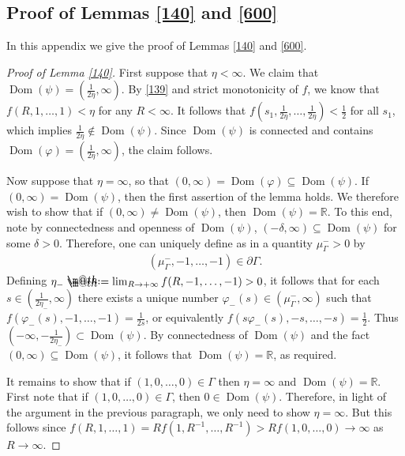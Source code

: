 \documentclass[12pt]{article}
\makeatletter
\numberwithin{equation}{section}
\theoremstyle{plain}
\theoremstyle{definition}
\renewcommand{\phi}{\varphi}
\newcommand*{\defeq}{\mathrel{\rlap{%
			\raisebox{0.3ex}{$\m@th\cdot$}}%
		\raisebox{-0.3ex}{$\m@th\cdot$}}%
	=}
\makeatother
\begin{document}
\begin{appendices}
	

	
\section{Proof of Lemmas \ref{140} and \ref{600}}\label{appa}

In this appendix we give the proof of Lemmas \ref{140} and \ref{600}. 

\begin{proof}[Proof of Lemma \ref{140}]
	First suppose that $\eta<\infty$. We claim that $\operatorname{Dom}(\psi) = (\frac{1}{2\eta},\infty)$. By \eqref{139} and strict monotonicity of $f$, we know that $f(R,1,\dots,1)<\eta$ for any $R<\infty$. It follows that $f(s_1,\frac{1}{2\eta},\dots,\frac{1}{2\eta})<\frac{1}{2}$ for all $s_1$, which implies $\frac{1}{2\eta}\not\in\operatorname{Dom}(\psi)$. Since $\operatorname{Dom}(\psi)$ is connected and contains $\operatorname{Dom}(\phi) = (\frac{1}{2\eta},\infty)$, the claim follows.\medskip 
	
	Now suppose that $\eta = \infty$, so that $(0,\infty)=\operatorname{Dom}(\phi)\subseteq \operatorname{Dom}(\psi)$. If $(0,\infty) = \operatorname{Dom}(\psi)$, then the first assertion of the lemma holds. We therefore wish to show that if $(0,\infty)\not= \operatorname{Dom}(\psi)$, then $\operatorname{Dom}(\psi)=\mathbb{R}$. To this end, note by connectedness and openness of $\operatorname{Dom}(\psi)$,  $(-\delta,\infty)\subseteq \operatorname{Dom}(\psi)$ for some $\delta>0$. Therefore, one can uniquely define as in \cite{LN14b} a quantity $\mu_\Gamma^->0$ by 
	\begin{align*}
	(\mu_\Gamma^-, -1, \dots, -1)\in\partial\Gamma. 
	\end{align*}
	Defining $\eta_- \defeq \lim_{R\rightarrow+\infty}f(R, -1, \dots, -1) > 0$, it follows that for each $s\in (\frac{1}{2\eta_-}, \infty)$ there exists a unique number $\phi_-(s)\in(\mu_\Gamma^-,\infty)$ such that $f(\phi_-(s), -1, \dots, -1) = \frac{1}{2s}$, or equivalently $f(s\phi_-(s), -s, \dots, -s) = \frac{1}{2}$. Thus $(-\infty, -\frac{1}{2\eta_-})\subset \operatorname{Dom}(\psi)$. By connectedness of $\operatorname{Dom}(\psi)$ and the fact $(0,\infty)\subseteq \operatorname{Dom}(\psi)$, it follows that $\operatorname{Dom}(\psi) = \mathbb{R}$, as required. \medskip 
	
	It remains to show that if $(1,0,\dots,0)\in\Gamma$ then $\eta=\infty$ and $\operatorname{Dom}(\psi)=\mathbb{R}$. First note that if $(1,0,\dots,0)\in\Gamma$, then $0\in\operatorname{Dom}(\psi)$. Therefore, in light of the argument in the previous paragraph, we only need to show $\eta = \infty$. But this follows since $f(R,1,\dots,1) =  Rf(1,R^{-1},\dots,R^{-1})> Rf(1,0,\dots,0)\rightarrow\infty$ as $R\rightarrow\infty$.
\end{proof}


\end{appendices}
\end{document}
